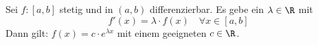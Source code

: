 Sei $f: [a, b]$ stetig und in $(a, b)$ differenzierbar. Es gebe ein $\lambda \in \R$ mit 
$$f'(x) = \lambda \cdot f(x) \quad \forall x \in [a, b]$$
Dann gilt: $f(x) = c \cdot e^{\lambda x}$ mit einem geeigneten $c \in \R$.